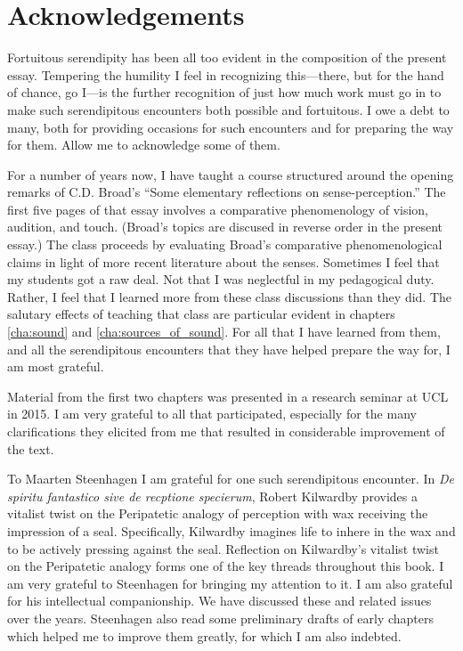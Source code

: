 \chapter*{Acknowledgements} %
\label{cha:acknowledgements}

Fortuitous serendipity has been all too evident in the composition of the present essay. Tempering the humility I feel in recognizing this---there, but for the hand of chance, go I---is the further recognition of just how much work must go in to make such serendipitous encounters both possible and fortuitous. I owe a debt to many, both for providing occasions for such encounters and for preparing the way for them. Allow me to acknowledge some of them.

For a number of years now, I have taught a course structured around the opening remarks of C.D. Broad's \citeyearpar{Broad:1952kx} ``Some elementary reflections on sense-per\-cep\-tion.'' The first five pages of that essay involves a comparative phenomenology of vision, audition, and touch. (Broad's topics are discused in reverse order in the present essay.) The class proceeds by evaluating Broad's comparative phenomenological claims in light of more recent literature about the senses. Sometimes I feel that my students got a raw deal. Not that I was neglectful in my pedagogical duty. Rather, I feel that I learned more from these class discussions than they did. The salutary effects of teaching that class are particular evident in chapters \ref{cha:sound} and \ref{cha:sources_of_sound}. For all that I have learned from them, and all the serendipitous encounters that they have helped prepare the way for, I am most grateful.

Material from the first two chapters was presented in a research seminar at UCL in 2015. I am very grateful to all that participated, especially for the many clarifications they elicited from me that resulted in considerable improvement of the text.

To Maarten Steenhagen I am grateful for one such serendipitous encounter. In \emph{De spiritu fantastico sive de recptione specierum}, Robert Kilwardby provides a vitalist twist on the Peripatetic analogy of perception with wax receiving the impression of a seal. Specifically, Kilwardby imagines life to inhere in the wax and to be actively pressing against the seal. Reflection on Kilwardby's vitalist twist on the Peripatetic analogy forms one of the key threads throughout this book. I am very grateful to Steenhagen for bringing my attention to it. I am also grateful for his intellectual companionship. We have discussed these and related issues over the years. Steenhagen also read some preliminary drafts of early chapters which helped me to improve them greatly, for which I am also indebted.

